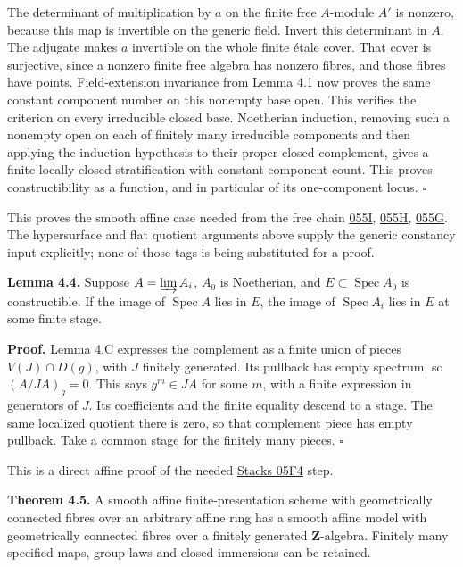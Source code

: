 \documentclass[11pt,a4paper,openany]{report}
\newcounter{none}
\begin{document}
The determinant of multiplication by \(a\) on the finite free \(A\)-module \(A'\) is nonzero, because this map is invertible on the generic field. Invert this determinant in \(A\). The adjugate makes \(a\) invertible on the whole finite étale cover. That cover is surjective, since a nonzero finite free algebra has nonzero fibres, and those fibres have points. Field-extension invariance from Lemma 4.1 now proves the same constant component number on this nonempty base open. This verifies the criterion on every irreducible closed base. Noetherian induction, removing such a nonempty open on each of finitely many irreducible components and then applying the induction hypothesis to their proper closed complement, gives a finite locally closed stratification with constant component count. This proves constructibility as a function, and in particular of its one-component locus. \(\square\)

This proves the smooth affine case needed from the free chain \href{https://stacks.math.columbia.edu/tag/055I}{055I}, \href{https://stacks.math.columbia.edu/tag/055H}{055H}, \href{https://stacks.math.columbia.edu/tag/055G}{055G}. The hypersurface and flat quotient arguments above supply the generic constancy input explicitly; none of those tags is being substituted for a proof.

\textbf{Lemma 4.4.} Suppose \(A=\varinjlim A_i\), \(A_0\) is Noetherian, and \(E\subset\operatorname{Spec}A_0\) is constructible. If the image of \(\operatorname{Spec}A\) lies in \(E\), the image of \(\operatorname{Spec}A_i\) lies in \(E\) at some finite stage.

\textbf{Proof.} Lemma 4.C expresses the complement as a finite union of pieces \(V(J)\cap D(g)\), with \(J\) finitely generated. Its pullback has empty spectrum, so \((A/JA)_g=0\). This says \(g^m\in JA\) for some \(m\), with a finite expression in generators of \(J\). Its coefficients and the finite equality descend to a stage. The same localized quotient there is zero, so that complement piece has empty pullback. Take a common stage for the finitely many pieces. \(\square\)

This is a direct affine proof of the needed \href{https://stacks.math.columbia.edu/tag/05F4}{Stacks 05F4} step.

\textbf{Theorem 4.5.} A smooth affine finite-presentation scheme with geometrically connected fibres over an arbitrary affine ring has a smooth affine model with geometrically connected fibres over a finitely generated \(\mathbf Z\)-algebra. Finitely many specified maps, group laws and closed immersions can be retained.
\end{document}
